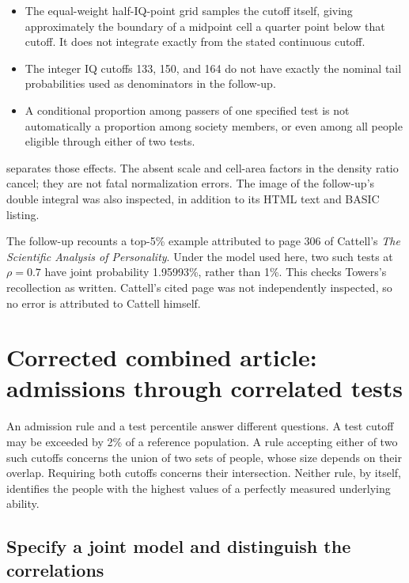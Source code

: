 \begin{itemize}
\item The equal-weight half-IQ-point grid samples the cutoff itself, giving
approximately the boundary of a midpoint cell a quarter point below that
cutoff. It does not integrate exactly from the stated continuous cutoff.
\item The integer IQ cutoffs 133, 150, and 164 do not have exactly the
nominal tail probabilities used as denominators in the follow-up.
\item A conditional proportion among passers of one specified test is not
automatically a proportion among society members, or even among all people
eligible through either of two tests.
\end{itemize}

 separates those effects. The absent scale and cell-area
factors in the density ratio cancel; they are not fatal normalization
errors. The image of the follow-up's double integral was also inspected,
in addition to its HTML text and BASIC listing.

The follow-up recounts a top-5\% example attributed to page 306 of Cattell's
\emph{The Scientific Analysis of Personality}. Under the model used here,
two such tests at \(\rho=0.7\) have joint probability 1.95993\%, rather than
1\%. This checks Towers's recollection as written. Cattell's cited page
was not independently inspected, so no error is attributed to Cattell
himself.

\chapter{Corrected combined article: admissions through correlated tests}
\label{sec:corrected}

An admission rule and a test percentile answer different questions. A test
cutoff may be exceeded by 2\% of a reference population. A rule accepting
either of two such cutoffs concerns the union of two sets of people, whose
size depends on their overlap. Requiring both cutoffs concerns their
intersection. Neither rule, by itself, identifies the people with the
highest values of a perfectly measured underlying ability.

\section{Specify a joint model and distinguish the correlations}

